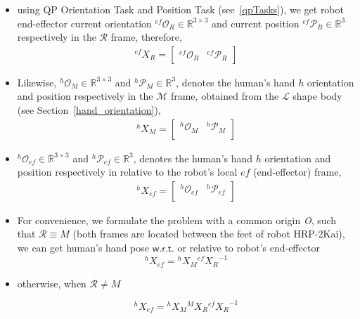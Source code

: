 \begin{itemize}
	\item using QP Orientation Task and Position Task (see~\ref{qpTasks}), we get robot end-effector current orientation ${{}^{ef}\mathcal{O}_R} \in \mathbb{R}^{3\times3}$ and current position ${{}^{ef}\mathcal{P}_R} \in \mathbb{R}^{3}$ respectively in the $\mathcal{R}$ frame, therefore,
	\begin{gather}\label{X_R_ef}
		{}^{ef}{X}_R =
		\left[\begin{array}{cc}
		{}^{ef}\mathcal{O}_R & {}^{ef}\mathcal{P}_R
		\end{array}\right]
	\end{gather}
	
	\item Likewise, ${{}^{h}\mathcal{O}_M} \in \mathbb{R}^{3\times3}$ and ${{}^{h}\mathcal{P}_M} \in \mathbb{R}^{3}$, denotes the human's hand $h$ orientation and position respectively in the $\mathcal{M}$ frame, obtained from the $\mathcal{L}$ shape body (see Section~\ref{hand_orientation}),
	\begin{gather}\label{X_M_h}
		{}^{h}{X}_M =
		\left[\begin{array}{cc}
		{}^{h}\mathcal{O}_M & {}^{h}\mathcal{P}_M \\
		\end{array}\right]
	\end{gather}

	\item ${{}^{h}\mathcal{O}_{ef}} \in \mathbb{R}^{3\times3}$ and ${{}^{h}\mathcal{P}_{ef}} \in \mathbb{R}^{3}$, denotes the human's hand $h$ orientation and position respectively in relative to the robot's local $ef$ (end-effector) frame,
	\begin{gather}\label{X_ef_h}
		{}^{h}{X}_{ef} =
		\left[\begin{array}{cc}
		{}^{h}\mathcal{O}_{ef} & {}^{h}\mathcal{P}_{ef} \\
		\end{array}\right]
	\end{gather}
	
	\item For convenience, we formulate the problem with a common origin {\it O}, such that $\mathcal R \equiv M$ (both frames are located between the feet of robot HRP-2Kai), we can get human's hand pose $\mathsf{w.r.t.}$ or relative to robot's end-effector
%	
	\begin{equation}\label{X_ef_h1}
		{}^{h}{X}_{ef} = {}^{h}{X}_{M}  {}^{ef}{X_{R}}^{-1}
	\end{equation}
	\item otherwise, when $\mathcal R \neq M$

	\begin{equation}\label{X_ef_h2}
	{}^{h}{X}_{ef} = {}^{h}{X}_{M}  {}^{M}{X}_R  {}^{ef}{X_{R}}^{-1}
	\end{equation}
	
\end{itemize}


